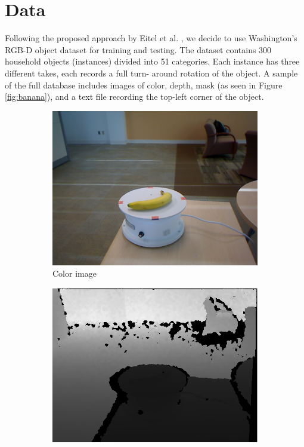 \documentclass[paper=letter, fontsize=12pt]{article}
\begin{document}
\section{Data}

Following the proposed approach by Eitel et al. \cite{Eitel2015}, we decide to
use Washington's RGB-D object dataset \cite{Lai2011} for training and testing.
The dataset contains 300 household objects (instances) divided into 51
categories. Each instance has three different takes, each records a full turn-
around rotation of the object. A sample of the full database includes images of
color, depth, mask (as seen in Figure \ref{fig:banana}), and a text file
recording the top-left corner of the object.

\begin{figure}[htbp]
	\centering
	\begin{subfigure}[b]{0.32\linewidth}
		\includegraphics[width=\textwidth]{banana_1_1_1}
		\caption{Color image}
	\end{subfigure}
	\begin{subfigure}[b]{0.32\linewidth}
		\includegraphics[width=\textwidth]{banana_1_1_1_depth}

\end{subfigure}
\end{figure}
\end{document}
